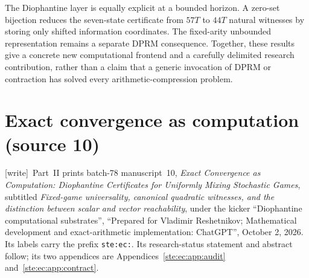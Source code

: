 \documentclass[11pt,letterpaper]{article}
\theoremstyle{definition}
\theoremstyle{remark}
\newcommand{\wtag}{\textup{[write]}}
\begin{document}
The Diophantine layer is equally explicit at a bounded horizon. A zero-set
bijection reduces the seven-state certificate from $57T$ to $44T$ natural
witnesses by storing only shifted information coordinates. The fixed-arity
unbounded representation remains a separate DPRM consequence. Together, these
results give a concrete new computational frontend and a carefully delimited
research contribution, rather than a claim that a generic invocation of DPRM
or contraction has solved every arithmetic-compression problem.


\part{Exact convergence as computation (source 10)}\label{ste:part:ec}

\noindent\wtag\ Part~II prints batch-78 manuscript~10, \emph{Exact Convergence as Computation: Diophantine Certificates for Uniformly Mixing Stochastic Games}, subtitled \emph{Fixed-game universality, canonical quadratic witnesses, and the distinction between scalar and vector reachability}, under the kicker ``Diophantine computational substrates'', ``Prepared for Vladimir Reshetnikov; Mathematical development and exact-arithmetic implementation: ChatGPT'', October 2, 2026. Its labels carry the prefix \texttt{ste:ec:}. Its research-status statement and abstract follow; its two appendices are Appendices~\ref{ste:ec:app:audit} and~\ref{ste:ec:app:contract}.
\end{document}
